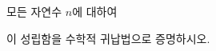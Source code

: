 \hspace*{2mm}\begin{minipage}[t]{\dimexpr\linewidth-2mm\relax}\vspace{0pt}
모든 자연수 $n$에 대하여 \par\smallskip{}\par\smallskip\noindent 이 성립함을 수학적 귀납법으로 증명하시오.\end{minipage}

